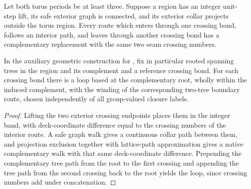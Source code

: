 \begin{lemma}%
    \label{thm:peps_torus_complement_path_replacement}
    \leanok
    Let both torus periods be at least three. Suppose a region has an
    integer unit-step lift, its safe exterior graph is connected, and
    its exterior collar projects outside the torus region.
    Every route which enters through one crossing bond, follows an
    interior path, and leaves through another crossing bond has a
    complementary replacement with the same two seam crossing numbers.

    In the auxiliary geometric construction for
    \cite[proof of Theorem~6.9]{Schuch2010PEPS}, fix in particular rooted
    spanning trees in the region and its complement and a reference crossing
    bond. For each crossing bond there is a loop based at the complementary
    root, wholly within the induced complement, with the winding of the
    corresponding two-tree boundary route, chosen independently of all
    group-valued closure labels.
\end{lemma}
\begin{proof}\leanok
    Lifting the two exterior crossing endpoints places them in the
    integer band, with deck-coordinate difference equal to the
    crossing numbers of the interior route. A safe graph walk gives
    a continuous collar path between them, and projection exclusion together with
    lattice-path approximation gives a native complementary walk with
    that same deck-coordinate difference. Prepending the complementary
    tree path from the root to the first crossing and appending the
    tree path from the second crossing back to the root yields the loop, since crossing
    numbers add under concatenation.
\end{proof}

